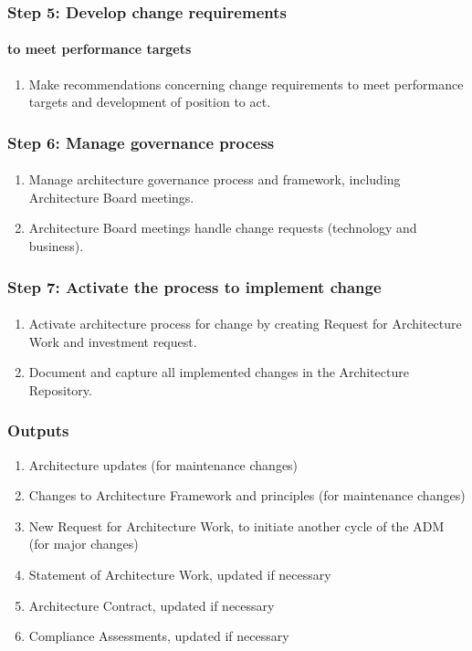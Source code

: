 \documentclass[aspectratio=169, table]{beamer}
\begin{document}
	\begin{frame}
		\frametitle{Step 5: Develop change requirements}
		\framesubtitle{to meet performance targets}
		\vspace{20pt}
		\begin{enumerate}
			\item Make recommendations concerning change requirements to meet
			performance targets and development of position to act.
		\end{enumerate}
	\end{frame}
	
	\begin{frame}
		\frametitle{Step 6: Manage governance process}
		\framesubtitle{\hspace{1cm}}
		\vspace{20pt}
		\begin{enumerate}
			\item Manage architecture governance process and framework, including Architecture Board meetings.
			
			\item Architecture Board meetings handle change requests (technology and business).
		\end{enumerate}
		
	\end{frame}
	
	\begin{frame}
		\frametitle{Step 7: Activate the process to implement change}
		\framesubtitle{\hspace{1cm}}
		\vspace{20pt}
		\begin{enumerate}
			\item Activate architecture process for change by creating Request for Architecture Work and investment request.
			
			\item Document and capture all implemented changes in the Architecture Repository.
		\end{enumerate}
		
	\end{frame}
	
	\begin{frame}
		\frametitle{Outputs}
		\vspace{22pt}
		\begin{enumerate}
			\item Architecture updates (for maintenance changes)
			\item Changes to Architecture Framework and principles (for maintenance changes)
			\item New Request for Architecture Work, to initiate another cycle of the ADM (for major changes)
			\item Statement of Architecture Work, updated if necessary
			\item Architecture Contract, updated if necessary
			\item Compliance Assessments, updated if necessary
		\end{enumerate}
	\end{frame}
	
\end{document}
